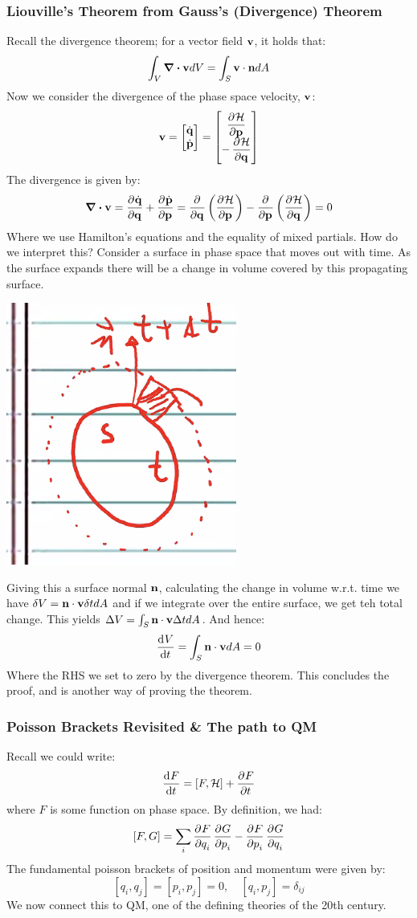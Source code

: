 \subsubsection{Liouville's Theorem from Gauss's (Divergence) Theorem}
Recall the divergence theorem; for a vector field $\mathbf{v}$, it holds that:
\[\int_V \div{\ensuremath{\mathbf{v}}} dV = \int_S \mathbf{v} \cdot \mathbf{n} dA\]
Now we consider the divergence of the phase space velocity, $\mathbf{v}$:
\[\v{v} = \m{\dot{\v{q}} \\ \dot{\v{p}}} = \m{\dpd{\HH}{\v{p}} \\ -\dpd{\HH}{\v{q}}}\]
The divergence is given by:
\[\div{\v{v}} = \dpd{\dot{\v{q}}}{\v{q}} + \dpd{\dot{\v{p}}}{\v{p}} = \dpd{}{\v{q}}\left(\dpd{\HH}{\v{p}}\right) - \dpd{}{\v{p}}\left(\dpd{\HH}{\v{q}}\right) = 0\]
Where we use Hamilton's equations and the equality of mixed partials. How do we interpret this? Consider a surface in phase space that moves out with time. As the surface expands there will be a change in volume covered by this propagating surface.
\begin{center}
    \includegraphics[scale=0.7]{Lecture-26/l26-img1.png}
\end{center}
Giving this a surface normal $\mathbf{n}$, calculating the change in volume w.r.t. time we have $\delta V = \mathbf{n}\cdot \mathbf{v}\delta t dA$ and if we integrate over the entire surface, we get teh total change. This yields $\Delta V = \int_S \mathbf{n} \cdot \mathbf{v}\Delta t dA$. And hence:
\[\dod{V}{t} = \int_S \v{n}\cdot \v{v}dA = 0\]
Where the RHS we set to zero by the divergence theorem. This concludes the proof, and is another way of proving the theorem.

\subsubsection{Poisson Brackets Revisited \& The path to QM}
Recall we could write:
\[\dod{F}{t} = [F, \HH] + \dpd{F}{t}\]
where $F$ is some function on phase space. By definition, we had:
\[[F, G] = \sum_i \dpd{F}{q_i}\dpd{G}{p_i} - \dpd{F}{p_i}\dpd{G}{q_i}\]
The fundamental poisson brackets of position and momentum were given by:
\[[q_i, q_j] = [p_i, p_j] = 0, \quad [q_i, p_j] = \delta_{ij}\]
We now connect this to QM, one of the defining theories of the 20th century. 

